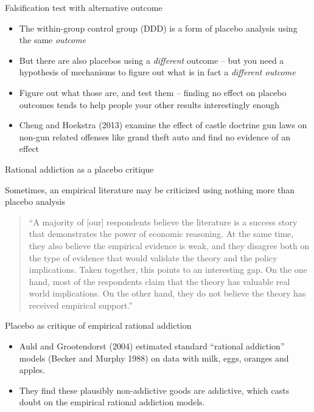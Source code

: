 \documentclass{beamer}
\begin{document}
\begin{frame}{Falsification test with alternative outcome}
	
	\begin{itemize}
	\item The within-group control group (DDD) is a form of placebo analysis using the same \emph{outcome}
	\item But there are also placebos using a \emph{different} outcome -- but you need a hypothesis of mechanisms to figure out what is in fact a \emph{different outcome}
	\item Figure out what those are, and test them -- finding no effect on placebo outcomes tends to help people your other results interestingly enough
	\item Cheng and Hoekstra (2013) examine the effect of castle doctrine gun laws on non-gun related offenses like grand theft auto and find no evidence of an effect 
	\end{itemize}
\end{frame}



\begin{frame}{Rational addiction as a placebo critique}


Sometimes, an empirical literature may be criticized using nothing more than placebo analysis

\begin{quote}``A majority of [our] respondents believe the literature is a success story that demonstrates the power of economic reasoning.  At the same time, they also believe the empirical evidence is weak, and they disagree both on the type of evidence that would validate the theory and the policy implications. Taken together, this points to an interesting gap.  On the one hand, most of the respondents claim that the theory has valuable real world implications.  On the other hand, they do not believe the theory has received empirical support.''
\end{quote}

\end{frame}

\begin{frame}{Placebo as critique of empirical rational addiction}

\begin{itemize}
	\item Auld and Grootendorst (2004) estimated standard ``rational addiction'' models (Becker and Murphy 1988) on data with milk, eggs, oranges and apples.  
	\item They find these plausibly non-addictive goods are addictive, which casts doubt on the empirical rational addiction models.
\end{itemize}

\end{frame}
\end{document}
